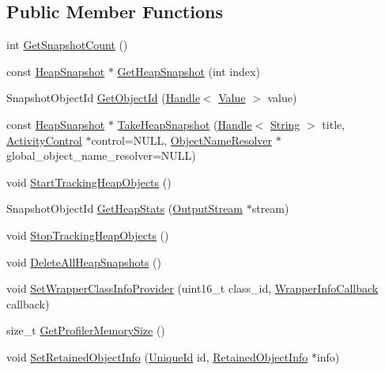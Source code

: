 \subsection*{Public Member Functions}
\begin{DoxyCompactItemize}
\item 
int \hyperlink{classv8_1_1_heap_profiler_a24830775a0ab938eb0a29ed8f3dfd265}{Get\+Snapshot\+Count} ()
\item 
const \hyperlink{classv8_1_1_heap_snapshot}{Heap\+Snapshot} $\ast$ \hyperlink{classv8_1_1_heap_profiler_af9093f6ca6e5558315f354c7ccb55484}{Get\+Heap\+Snapshot} (int index)
\item 
Snapshot\+Object\+Id \hyperlink{classv8_1_1_heap_profiler_a03157eb3b1d28e602832026f95c6e3fb}{Get\+Object\+Id} (\hyperlink{classv8_1_1_handle}{Handle}$<$ \hyperlink{classv8_1_1_value}{Value} $>$ value)
\item 
const \hyperlink{classv8_1_1_heap_snapshot}{Heap\+Snapshot} $\ast$ \hyperlink{classv8_1_1_heap_profiler_acaff4d33babbca49a7308c89e2d910cc}{Take\+Heap\+Snapshot} (\hyperlink{classv8_1_1_handle}{Handle}$<$ \hyperlink{classv8_1_1_string}{String} $>$ title, \hyperlink{classv8_1_1_activity_control}{Activity\+Control} $\ast$control=N\+U\+L\+L, \hyperlink{classv8_1_1_heap_profiler_1_1_object_name_resolver}{Object\+Name\+Resolver} $\ast$global\+\_\+object\+\_\+name\+\_\+resolver=N\+U\+L\+L)
\item 
void \hyperlink{classv8_1_1_heap_profiler_ad352d5549c9ef8e26b2d936778f0c4cf}{Start\+Tracking\+Heap\+Objects} ()
\item 
Snapshot\+Object\+Id \hyperlink{classv8_1_1_heap_profiler_a87a69789d8dc75faa97011150ad17c8e}{Get\+Heap\+Stats} (\hyperlink{classv8_1_1_output_stream}{Output\+Stream} $\ast$stream)
\item 
void \hyperlink{classv8_1_1_heap_profiler_ae448d9474ae34781133d4a4547b08cb1}{Stop\+Tracking\+Heap\+Objects} ()
\item 
void \hyperlink{classv8_1_1_heap_profiler_a6a75bcc6d8350858597b6a6ce5e349a2}{Delete\+All\+Heap\+Snapshots} ()
\item 
void \hyperlink{classv8_1_1_heap_profiler_a7744cf111ad9c6b0b409841f8ed8bcdd}{Set\+Wrapper\+Class\+Info\+Provider} (uint16\+\_\+t class\+\_\+id, \hyperlink{classv8_1_1_heap_profiler_a696d8d6590879eeb5a4ad2814eafb599}{Wrapper\+Info\+Callback} callback)
\item 
size\+\_\+t \hyperlink{classv8_1_1_heap_profiler_a76435e93466db7519fb31417ea39b13e}{Get\+Profiler\+Memory\+Size} ()
\item 
void \hyperlink{classv8_1_1_heap_profiler_a70821ff8e1c2cc92c310c5c4f1fa5ec7}{Set\+Retained\+Object\+Info} (\hyperlink{classv8_1_1_unique_id}{Unique\+Id} id, \hyperlink{classv8_1_1_retained_object_info}{Retained\+Object\+Info} $\ast$info)
\end{DoxyCompactItemize}

